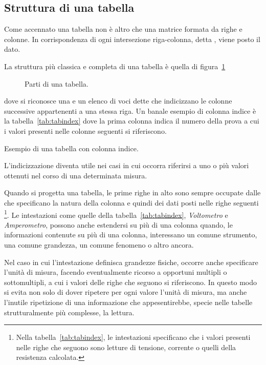 				\subsection{Struttura di una tabella}

Come accennato una tabella non è altro che una matrice formata da righe e colonne. In corrispondenza di ogni intersezione riga-colonna, detta , viene posto il dato.

La struttura più classica e completa di una tabella è quella di figura~\ref{fig:tab_index}
\begin{figure}[htp!b!]
\centering\small
    \tabindice
    \caption{Parti di una tabella.}
    \label{fig:tab_index}
\end{figure}
dove si riconosce una  e un elenco di voci dette  che indicizzano le colonne successive appartenenti a una stessa riga. Un banale esempio di colonna indice è la tabella~\ref{tab:tabindex} dove la prima colonna indica il numero della prova a cui i valori presenti nelle colonne seguenti si riferiscono.
\begin{table}[h!tp]
 \centering\small
 \caption{Esempio di una tabella con colonna indice.}
 \tabesempioaA
 \label{tab:tabindex}
\end{table}

L'indicizzazione diventa utile nei casi in cui occorra riferirsi a uno o più valori ottenuti nel corso di una determinata misura.

Quando si progetta una tabella, le prime righe in alto sono sempre occupate dalle  che specificano la natura della colonna e quindi dei dati posti nelle righe seguenti%
			\footnote{Nella tabella~\ref{tab:tabindex}, le intestazioni specificano che i valori presenti nelle righe che seguono sono letture di tensione, corrente o quelli della resistenza calcolata.}.
Le intestazioni come quelle della tabella~\ref{tab:tabindex}, \textit{Voltometro} e \textit{Amperometro}, possono anche estendersi su più di una colonna quando, le informazioni contenute su più di una colonna, interessano un comune strumento, una comune grandezza, un comune fenomeno o altro ancora.

Nel caso in cui l'intestazione definisca grandezze fisiche, occorre anche specificare l'unità di misura, facendo eventualmente ricorso a opportuni multipli o sottomultipli, a cui i valori delle righe che seguono si riferiscono. In questo modo si evita non solo di dover ripetere per ogni valore l'unità di misura, ma anche l'inutile ripetizione di una informazione che appesentirebbe, specie nelle tabelle strutturalmente più complesse, la lettura.

